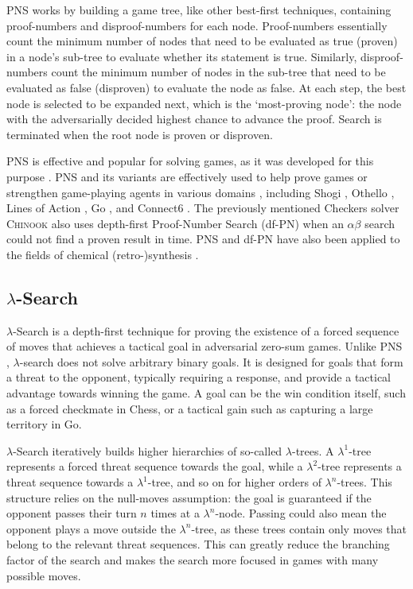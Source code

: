 PNS works by building a game tree, like other best-first techniques, containing proof-numbers and disproof-numbers for each node. Proof-numbers essentially count the minimum number of nodes that need to be evaluated as true (proven) in a node’s sub-tree to evaluate whether its statement is true. Similarly, disproof-numbers count the minimum number of nodes in the sub-tree that need to be evaluated as false (disproven) to evaluate the node as false. At each step, the best node is selected to be expanded next, which is the `most-proving node’: the node with the adversarially decided highest chance to advance the proof. Search is terminated when the root node is proven or disproven.

PNS is effective and popular for solving games, as it was developed for this purpose \cite{Allis1994}. PNS and its variants are effectively used to help prove games or strengthen game-playing agents in various domains \cite{Winands2012}, including Shogi \cite{Seo2001}, Othello \cite{Nagai2002}, Lines of Action \cite{Winands2004}, Go \cite{Kishimoto2005b}, and Connect6 \cite{Xu2009, Wu2011}. The previously mentioned Checkers solver \textsc{Chinook} \cite{Schaeffer2007} also uses depth-first Proof-Number Search (df-PN) \cite{Nagai2002} when an $\alpha\beta$ search could not find a proven result in time. PNS and df-PN have also been applied to the fields of chemical (retro-)synthesis \cite{HeifetsJurisica2012, Franz2022}.

\subsection{\texorpdfstring{$\lambda$}{λ}-Search}
\label{subsec:lambdaSearch}
$\lambda$-Search \cite{Thomsen2000} is a depth-first technique for proving the existence of a forced sequence of moves that achieves a tactical goal in adversarial zero-sum games. Unlike PNS \cite{Allis1994}, $\lambda$-search does not solve arbitrary binary goals. It is designed for goals that form a threat to the opponent, typically requiring a response, and provide a tactical advantage towards winning the game. A goal can be the win condition itself, such as a forced checkmate in Chess, or a tactical gain such as capturing a large territory in Go.

$\lambda$-Search iteratively builds higher hierarchies of so-called $\lambda$-trees. A $\lambda^1$-tree represents a forced threat sequence towards the goal, while a $\lambda^2$-tree represents a threat sequence towards a $\lambda^1$-tree, and so on for higher orders of $\lambda^n$-trees. This structure relies on the null-moves assumption: the goal is guaranteed if the opponent passes their turn $n$ times at a $\lambda^n$-node. Passing could also mean the opponent plays a move outside the $\lambda^n$-tree, as these trees contain only moves that belong to the relevant threat sequences. This can greatly reduce the branching factor of the search and makes the search more focused in games with many possible moves.

